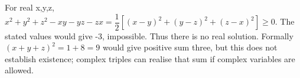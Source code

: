 For real x,y,z, $x^2+y^2+z^2-xy-yz-zx=\dfrac{1}{2}[(x-y)^2+(y-z)^2+(z-x)^2]\ge0$. The stated values would give -3, impossible. Thus there is no real solution. Formally $(x+y+z)^2=1+8=9$ would give positive sum three, but this does not establish existence; complex triples can realise that sum if complex variables are allowed.
